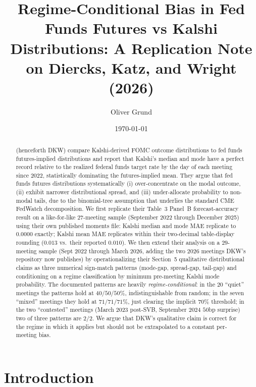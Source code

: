 \documentclass[11pt]{article}
\title{\bfseries Regime-Conditional Bias in Fed Funds Futures vs Kalshi
Distributions: A Replication Note on Diercks, Katz, and Wright (2026)}
\author{Oliver Grund}
\date{\today}
\begin{document}
\maketitle

\begin{abstract}
\noindent
\citet{dkw2026} (henceforth DKW) compare Kalshi-derived FOMC outcome
distributions to fed funds futures-implied distributions and report
that Kalshi's median and mode have a perfect record relative to the
realized federal funds target rate by the day of each meeting since
2022, statistically dominating the futures-implied mean. They argue
that fed funds futures distributions systematically (i)
over-concentrate on the modal outcome, (ii) exhibit narrower
distributional spread, and (iii) under-allocate probability to
non-modal tails, due to the binomial-tree assumption that underlies
the standard CME FedWatch decomposition. We first replicate their
Table~3 Panel~B forecast-accuracy result on a like-for-like
$27$-meeting sample (September 2022 through December 2025) using their
own published moments file: Kalshi median and mode MAE replicate to
$0.0000$ exactly; Kalshi mean MAE replicates within their two-decimal
table-display rounding ($0.013$ vs.\ their reported $0.010$). We then
extend their analysis on a $29$-meeting sample (Sept 2022 through
March 2026, adding the two 2026 meetings DKW's repository now
publishes) by operationalizing their Section~5 qualitative
distributional claims as three numerical sign-match patterns
(mode-gap, spread-gap, tail-gap) and conditioning on a regime
classification by minimum pre-meeting Kalshi mode probability. The
documented patterns are heavily \emph{regime-conditional}: in the
$20$ ``quiet'' meetings the patterns hold at $40/50/50\%$,
indistinguishable from random; in the seven ``mixed'' meetings they
hold at $71/71/71\%$, just clearing the implicit $70\%$ threshold;
in the two ``contested'' meetings (March 2023 post-SVB, September
2024 $50$bp surprise) two of three patterns are $2/2$. We argue
that DKW's qualitative claim is correct for the regime in which it
applies but should not be extrapolated to a constant per-meeting
bias.
\end{abstract}

\section{Introduction}
\end{document}
